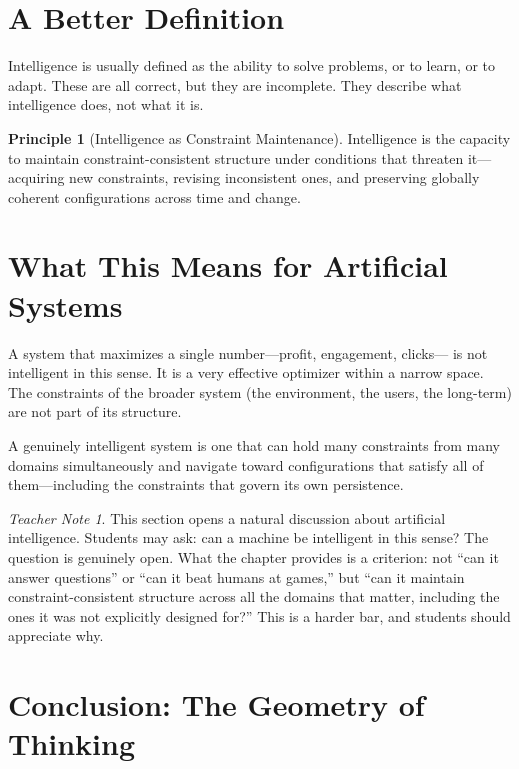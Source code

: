 \documentclass[11pt]{book}
\theoremstyle{definition}
\newtheorem{principle}[definition]{Principle}
\theoremstyle{remark}
\newtheorem{teachernote}{Teacher Note}[chapter]
\begin{document}
\section{A Better Definition}

Intelligence is usually defined as the ability to solve problems, or to
learn, or to adapt. These are all correct, but they are incomplete. They
describe what intelligence does, not what it is.

\begin{principle}[Intelligence as Constraint Maintenance]
Intelligence is the capacity to maintain constraint-consistent structure
under conditions that threaten it---acquiring new constraints, revising
inconsistent ones, and preserving globally coherent configurations across
time and change.
\end{principle}

\section{What This Means for Artificial Systems}

A system that maximizes a single number---profit, engagement, clicks---
is not intelligent in this sense. It is a very effective optimizer within
a narrow space. The constraints of the broader system (the environment,
the users, the long-term) are not part of its structure.

A genuinely intelligent system is one that can hold many constraints from
many domains simultaneously and navigate toward configurations that satisfy
all of them---including the constraints that govern its own persistence.

\begin{teachernote}
This section opens a natural discussion about artificial intelligence.
Students may ask: can a machine be intelligent in this sense? The
question is genuinely open. What the chapter provides is a criterion:
not ``can it answer questions'' or ``can it beat humans at games,''
but ``can it maintain constraint-consistent structure across all the
domains that matter, including the ones it was not explicitly designed
for?'' This is a harder bar, and students should appreciate why.
\end{teachernote}

\section{Conclusion: The Geometry of Thinking}
\end{document}
